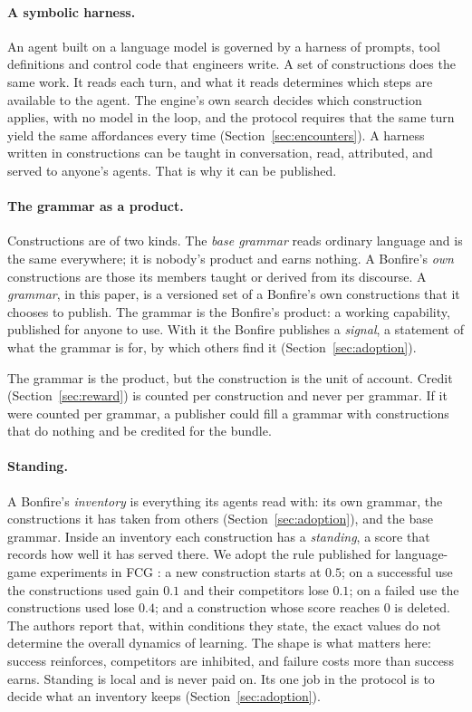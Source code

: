 \paragraph{A symbolic harness.} An agent built on a language model is governed by a harness of prompts, tool
definitions and control code that engineers write. A
set of constructions does the same work. It reads each turn, and what it reads determines which steps are available
to the agent. The engine's own search decides which construction applies, with no model in the loop, and the
protocol requires that the same turn yield the same affordances every time (Section~\ref{sec:encounters}). A harness written in constructions can be taught in conversation,
read, attributed, and served to anyone's agents. That is why it can be published.

\paragraph{The grammar as a product.} Constructions are of two kinds. The \emph{base grammar} reads ordinary
language and is the same everywhere; it is nobody's product and earns nothing. A Bonfire's \emph{own}
constructions are those its members taught or derived from its discourse. A \emph{grammar}, in this paper, is a
versioned set of a Bonfire's own constructions that it chooses to publish. The grammar is the Bonfire's product: a
working capability, published for anyone to use. With it the Bonfire publishes a \emph{signal}, a statement of what
the grammar is for, by which others find it (Section~\ref{sec:adoption}).

The grammar is the product, but the construction is the unit of account. Credit (Section~\ref{sec:reward}) is
counted per construction and never per grammar. If it were counted per grammar, a publisher could fill a grammar
with constructions that do nothing and be credited for the bundle.

\paragraph{Standing.} A Bonfire's \emph{inventory} is everything its agents read with: its own grammar, the constructions it has
taken from others (Section~\ref{sec:adoption}), and the base grammar. Inside
an inventory each construction has a \emph{standing}, a score that records how well it has served there. We adopt
the rule published for language-game experiments in FCG \citep{nevens2022language}: a new construction starts at
$0.5$; on a successful use the constructions used gain $0.1$ and their competitors lose $0.1$; on a failed use the
constructions used lose $0.4$; and a construction whose score reaches $0$ is deleted. The authors report that,
within conditions they state, the exact values do not determine the overall dynamics of learning. The shape is what
matters here: success reinforces, competitors are inhibited, and failure costs more than success earns. Standing
is local and is never paid on. Its one job in the protocol is to decide what an inventory keeps
(Section~\ref{sec:adoption}).
